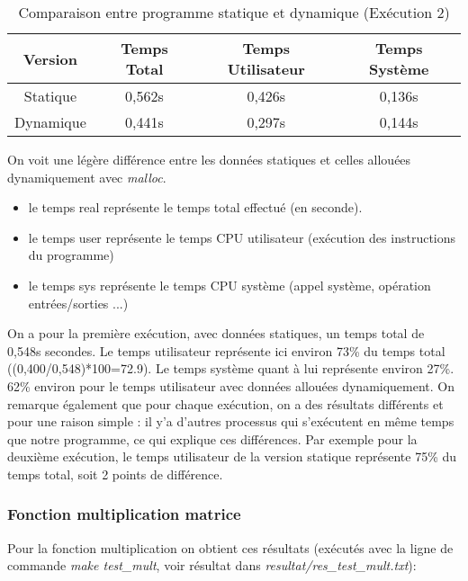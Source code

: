\documentclass{rapport}
\begin{document}
\begin{table}[h!]
    \centering
    \begin{tabular}{|c|c|c|c|}
        \hline
        Version & Temps Total & Temps Utilisateur & Temps Système \\
        \hline
        Statique & 0,562s & 0,426s & 0,136s \\
        \hline
        Dynamique & 0,441s & 0,297s & 0,144s \\
        \hline
    \end{tabular}
    \caption{Comparaison entre programme statique et dynamique (Exécution 2)}
\end{table}
  
  On voit une légère différence entre les données statiques et celles allouées dynamiquement avec \textit{malloc}.
  \begin{itemize}
        \item le temps real représente le temps total effectué (en seconde).
    \end{itemize}
    \begin{itemize}
        \item le temps user représente le temps CPU utilisateur (exécution des instructions du programme)
    \end{itemize}
    \begin{itemize}
        \item le temps sys représente le temps CPU système (appel système, opération entrées/sorties ...)
    \end{itemize}\textit{}
    On a pour la première exécution, avec données statiques, un temps total de 0,548s secondes. Le temps utilisateur représente ici environ 73\% du temps total ((0,400/0,548)*100=72.9). Le temps système quant à lui représente environ 27\%.
    62\% environ pour le temps utilisateur avec données allouées dynamiquement.
    \newline
  \indent On remarque également que pour chaque exécution, on a des résultats différents et pour une raison simple : il y'a d'autres processus qui s'exécutent en même temps que notre programme, ce qui explique ces différences. Par exemple pour la deuxième exécution, le temps utilisateur de la version statique représente 75\% du temps total, soit 2 points de différence.
 \subsubsection{Fonction multiplication matrice}
  Pour la fonction multiplication on obtient ces résultats (exécutés avec la ligne de commande \textit{make test\_mult}, voir résultat dans \textit{resultat/res\_test\_mult.txt}):
\end{document}
